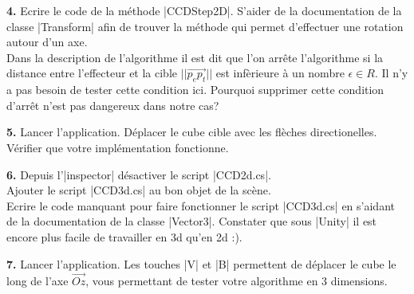 \documentclass{article}
\newcommand{\question}[2]{{\noindent \bf #1} #2}
\begin{document}
\question{4.}Ecrire le code de la m\'ethode |CCDStep2D|. S'aider de la documentation de la classe |Transform| afin de trouver la m\'ethode qui permet
d'effectuer une rotation autour d'un axe. \\
Dans la description de l'algorithme il est dit que l'on arr\^ete l'algorithme si la distance entre l'effecteur et la cible $||\vec{p_ep_t}||$ est inf\`erieure \`a un nombre $\epsilon \in R$.
Il n'y a pas besoin de tester cette condition ici. Pourquoi supprimer cette condition d'arr\^et n'est pas dangereux dans notre cas? \newline

\question{5.}
Lancer l'application. D\'eplacer le cube cible avec les fl\`eches directionelles. V\'erifier que votre impl\'ementation fonctionne. \newline

\question{6.}
Depuis l'|inspector| d\'esactiver le script |CCD2d.cs|. \\ Ajouter le script |CCD3d.cs| au bon objet de la sc\`ene.\\
Ecrire le code manquant pour faire fonctionner le script |CCD3d.cs| en s'aidant de la documentation de la classe |Vector3|.
Constater que sous |Unity| il est encore plus facile de travailler en 3d qu'en 2d :). \newline


\question{7.}
Lancer l'application. Les touches |V| et |B| permettent de d\'eplacer le cube le long de l'axe $\vec{Oz}$, vous permettant de tester votre 
algorithme en 3 dimensions.
\end{document}

